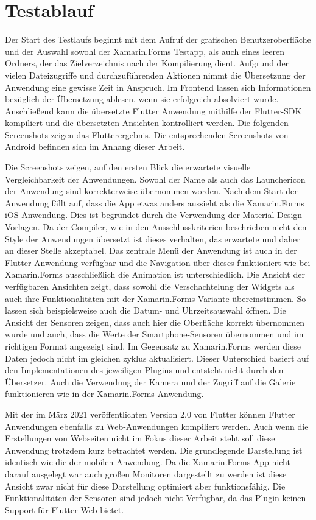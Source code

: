 \section{Testablauf}
Der Start  des Testlaufs beginnt mit dem Aufruf der grafischen Benutzeroberfläche und der Auswahl sowohl der Xamarin.Forms Testapp, als auch eines leeren Ordners, der das Zielverzeichnis nach der Kompilierung dient. 
Aufgrund der vielen Dateizugriffe und durchzuführenden Aktionen nimmt die Übersetzung der Anwendung eine gewisse Zeit in Anspruch.  Im Frontend lassen sich Informationen bezüglich der Übersetzung ablesen, wenn sie erfolgreich absolviert wurde.  Anschließend kann die übersetzte Flutter Anwendung mithilfe der Flutter-SDK kompiliert und die übersetzten Ansichten kontrolliert werden.  Die folgenden Screenshots zeigen das Flutterergebnis. Die entsprechenden Screenshots von Android befinden sich im Anhang dieser Arbeit.

Die Screenshots zeigen,  auf den ersten Blick die erwartete visuelle Vergleichbarkeit der Anwendungen.  Sowohl der Name als auch das Launchericon der Anwendung sind korrekterweise übernommen worden.  Nach dem Start der Anwendung fällt auf,  dass die App etwas anders aussieht als die Xamarin.Forms iOS Anwendung.  Dies ist begründet durch die Verwendung der Material Design Vorlagen.  Da der Compiler, wie in den Ausschlusskriterien beschrieben nicht den Style der Anwendungen übersetzt ist dieses verhalten,  das erwartete und daher an dieser Stelle akzeptabel.  Das zentrale Menü der Anwendung ist auch in der Flutter Anwendung verfügbar und die Navigation über dieses funktioniert wie bei Xamarin.Forms ausschließlich die Animation ist unterschiedlich.  Die Ansicht der verfügbaren Ansichten zeigt, dass sowohl die Verschachtelung der Widgets als auch ihre Funktionalitäten mit der Xamarin.Forms Variante übereinstimmen.  So lassen sich beispielsweise auch die Datum- und Uhrzeitsauswahl öffnen. 
Die Ansicht der Sensoren zeigen,  dass auch hier die Oberfläche korrekt übernommen wurde und auch,  dass die Werte der Smartphone-Sensoren übernommen und im richtigen Format angezeigt sind.  Im Gegensatz zu Xamarin.Forms werden diese Daten jedoch nicht im gleichen zyklus aktualisiert.  Dieser Unterschied basiert auf den Implementationen des jeweiligen Plugins und entsteht nicht durch den Übersetzer.  Auch die Verwendung der Kamera und der Zugriff auf die Galerie funktionieren wie in der Xamarin.Forms Anwendung. 

Mit der im März 2021 veröffentlichten Version 2.0 von Flutter können Flutter Anwendungen ebenfalls zu Web-Anwendungen kompiliert werden.  Auch wenn die Erstellungen von Webseiten nicht im Fokus dieser Arbeit steht soll diese Anwendung trotzdem kurz betrachtet werden.  Die grundlegende Darstellung ist identisch wie die der mobilen Anwendung.  Da die Xamarin.Forms App nicht darauf ausgelegt war auch großen Monitoren dargestellt zu werden ist diese Ansicht zwar nicht für diese Darstellung optimiert aber funktionsfähig.  Die Funktionalitäten der Sensoren sind jedoch nicht Verfügbar, da das Plugin keinen Support für Flutter-Web bietet. 

